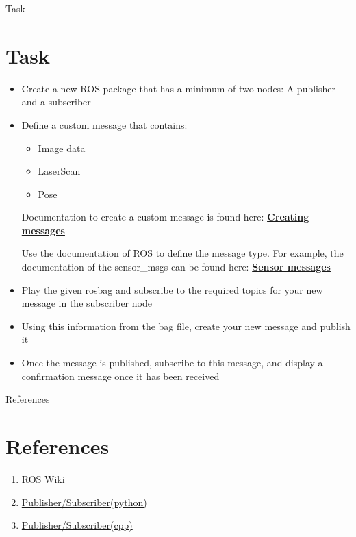 \documentclass{beamer}
\begin{document}
\begin{frame}{Task}
	\section{Task}
	\begin{itemize}
		\item Create a new ROS package that has a minimum of two nodes: A publisher and a subscriber
		\item Define a custom message that contains:
		\begin{itemize}
			\item Image data
			\item LaserScan
			\item Pose 
		\end{itemize}
		Documentation to create a custom message is found here: 
	    \textbf{\href{http://wiki.ros.org/ROS/Tutorials/CreatingMsgAndSrv}{Creating messages}}
	    
		Use the documentation of ROS to define the message type. For example, the documentation of the sensor\_msgs can be found here: \textbf{\href{http://docs.ros.org/api/sensor_msgs/html/index-msg.html}{Sensor messages}}
		\item Play the given rosbag and subscribe to the required topics for your new message in the subscriber node
		\item Using this information from the bag file, create your new message and publish it
		\item Once the message is published, subscribe to this message, and display a confirmation message once it has been received
	\end{itemize}
\end{frame}

\begin{frame}{References}
	\section{References}
	\begin{enumerate}
		\item {\href{http://wiki.ros.org/custom/images/wiki/ROS_basic_concepts.png}{ROS Wiki}}
		\item {\href{http://wiki.ros.org/rospy/Overview/}{Publisher/Subscriber(python)}}
		\item {\href{http://wiki.ros.org/roscpp/Overview}{Publisher/Subscriber(cpp)}}
	\end{enumerate}
\end{frame}
\end{document}

